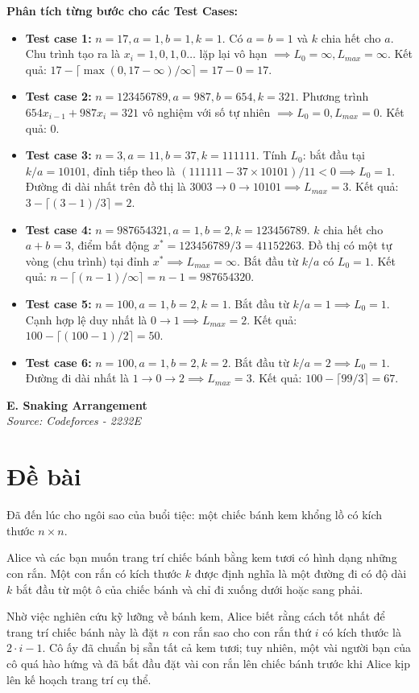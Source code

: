 \documentclass[11pt]{article}
\newcommand{\problem}[2]{
    \begin{problembox}
    \begin{center}
        \Large \textbf{#1} \\
        \vspace{0.2cm}
        \small \textit{Source: #2}
    \end{center}
    \end{problembox}
}
\begin{document}
\textbf{Phân tích từng bước cho các Test Cases:}
\begin{itemize}
    \item \textbf{Test case 1:} $n=17, a=1, b=1, k=1$. Có $a=b=1$ và $k$ chia hết cho $a$. Chu trình tạo ra là $x_i = 1, 0, 1, 0 \dots$ lặp lại vô hạn $\implies L_0 = \infty, L_{max} = \infty$. Kết quả: $17 - \lceil \max(0, 17-\infty)/\infty \rceil = 17 - 0 = 17$.
    \item \textbf{Test case 2:} $n=123456789, a=987, b=654, k=321$. Phương trình $654 x_{i-1} + 987 x_i = 321$ vô nghiệm với số tự nhiên $\implies L_0 = 0, L_{max} = 0$. Kết quả: 0.
    \item \textbf{Test case 3:} $n=3, a=11, b=37, k=111111$. Tính $L_0$: bắt đầu tại $k/a = 10101$, đỉnh tiếp theo là $(111111 - 37 \times 10101) / 11 < 0 \implies L_0 = 1$. Đường đi dài nhất trên đồ thị là $3003 \to 0 \to 10101 \implies L_{max} = 3$. Kết quả: $3 - \lceil (3 - 1)/3 \rceil = 2$.
    \item \textbf{Test case 4:} $n=987654321, a=1, b=2, k=123456789$. $k$ chia hết cho $a+b = 3$, điểm bất động $x^* = 123456789 / 3 = 41152263$. Đồ thị có một tự vòng (chu trình) tại đỉnh $x^* \implies L_{max} = \infty$. Bắt đầu từ $k/a$ có $L_0 = 1$. Kết quả: $n - \lceil (n-1)/\infty \rceil = n - 1 = 987654320$.
    \item \textbf{Test case 5:} $n=100, a=1, b=2, k=1$. Bắt đầu từ $k/a = 1 \implies L_0 = 1$. Cạnh hợp lệ duy nhất là $0 \to 1 \implies L_{max} = 2$. Kết quả: $100 - \lceil (100 - 1)/2 \rceil = 50$.
    \item \textbf{Test case 6:} $n=100, a=1, b=2, k=2$. Bắt đầu từ $k/a = 2 \implies L_0 = 1$. Đường đi dài nhất là $1 \to 0 \to 2 \implies L_{max} = 3$. Kết quả: $100 - \lceil 99/3 \rceil = 67$.
\end{itemize}

\newpage
\problem{E. Snaking Arrangement}{Codeforces - 2232E}

\section*{Đề bài}
Đã đến lúc cho ngôi sao của buổi tiệc: một chiếc bánh kem khổng lồ có kích thước $n \times n$.

Alice và các bạn muốn trang trí chiếc bánh bằng kem tươi có hình dạng những con rắn. Một con rắn có kích thước $k$ được định nghĩa là một đường đi có độ dài $k$ bắt đầu từ một ô của chiếc bánh và chỉ đi xuống dưới hoặc sang phải.

Nhờ việc nghiên cứu kỹ lưỡng về bánh kem, Alice biết rằng cách tốt nhất để trang trí chiếc bánh này là đặt $n$ con rắn sao cho con rắn thứ $i$ có kích thước là $2 \cdot i - 1$. Cô ấy đã chuẩn bị sẵn tất cả kem tươi; tuy nhiên, một vài người bạn của cô quá hào hứng và đã bắt đầu đặt vài con rắn lên chiếc bánh trước khi Alice kịp lên kế hoạch trang trí cụ thể.
\end{document}

